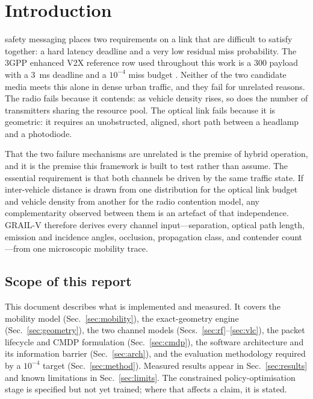 \documentclass[conference]{IEEEtran}
\begin{document}
\section{Introduction}

 safety messaging places two requirements on a link
that are difficult to satisfy together: a hard latency deadline and a very low
residual miss probability. The 3GPP enhanced V2X reference row used throughout
this work is a \SI{300}{\byte} payload with a \SI{3}{\milli\second} deadline
and a $10^{-4}$ miss budget \cite{tr38913}. Neither of the two candidate media
meets this alone in dense urban traffic, and they fail for unrelated reasons.
The radio fails because it contends: as vehicle density rises, so does the
number of transmitters sharing the resource pool. The optical link fails
because it is geometric: it requires an unobstructed, aligned, short path
between a headlamp and a photodiode.

That the two failure mechanisms are unrelated is the premise of hybrid
operation, and it is the premise this framework is built to test rather than
assume. The essential requirement is that both channels be driven by the same
traffic state. If inter-vehicle distance is drawn from one distribution for
the optical link budget and vehicle density from another for the radio
contention model, any complementarity observed between them is an artefact of
that independence. GRAIL-V therefore derives every channel input---separation,
optical path length, emission and incidence angles, occlusion, propagation
class, and contender count---from one microscopic mobility trace.

\subsection{Scope of this report}

This document describes what is implemented and measured. It covers the
mobility model (Sec.~\ref{sec:mobility}), the exact-geometry engine
(Sec.~\ref{sec:geometry}), the two channel models
(Secs.~\ref{sec:rf}--\ref{sec:vlc}), the packet lifecycle and CMDP
formulation (Sec.~\ref{sec:cmdp}), the software architecture and its
information barrier (Sec.~\ref{sec:arch}), and the evaluation methodology
required by a $10^{-4}$ target (Sec.~\ref{sec:method}). Measured results
appear in Sec.~\ref{sec:results} and known limitations in
Sec.~\ref{sec:limits}. The constrained policy-optimisation stage is specified
but not yet trained; where that affects a claim, it is stated.
\end{document}
